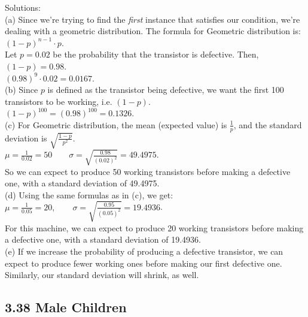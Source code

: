 \documentclass[]{article}
\begin{document}
Solutions:\\
(a) Since we're trying to find the \emph{first} instance that satisfies
our condition, we're dealing with a geometric distribution. The formula
for Geometric distribution is: \((1-p)^{n-1}\cdot p\).\\
Let \(p = 0.02\) be the probability that the transistor is defective.
Then, \((1-p) = 0.98\).\\
\((0.98)^{9}\cdot 0.02 = 0.0167\).\\
(b) Since \(p\) is defined as the transistor being defective, we want
the first 100 transistors to be working, i.e. \((1-p)\).\\
\((1-p)^{100} = (0.98)^{100} = 0.1326\).\\
(c) For Geometric distribution, the mean (expected value) is
\(\frac{1}{p}\), and the standard deviation is
\(\sqrt{\frac{1-p}{p^2}}\).\\
\(\mu = \frac{1}{0.02} = 50 \qquad \sigma = \sqrt{\frac{0.98}{(0.02)^2}} = 49.4975\).\\
So we can expect to produce 50 working transistors before making a
defective one, with a standard deviation of 49.4975.\\
(d) Using the same formulas as in (c), we get:\\
\(\mu = \frac{1}{0.05} = 20, \qquad \sigma = \sqrt{\frac{0.95}{(0.05)^2}} = 19.4936\).\\
For this machine, we can expect to produce 20 working transistors before
making a defective one, with a standard deviation of 19.4936.\\
(e) If we increase the probability of producing a defective transistor,
we can expect to produce fewer working ones before making our first
defective one. Similarly, our standard deviation will shrink, as well.

\subsection{3.38 Male Children}\label{male-children}
\end{document}
